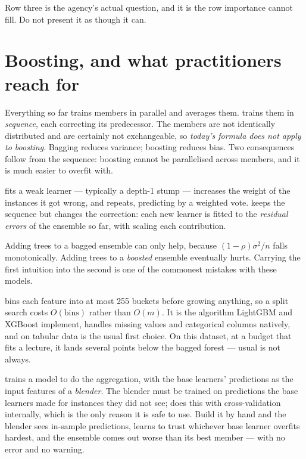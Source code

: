 \documentclass[11pt,a4paper]{article}
\begin{document}
Row three is the agency's actual question, and it is the row importance cannot
fill. Do not present it as though it can.

\section{Boosting, and what practitioners reach for}

Everything so far trains members in parallel and averages them. 
trains them in \emph{sequence}, each correcting its predecessor. The members
are not identically distributed and are certainly not exchangeable, so
\emph{today's formula does not apply to boosting}. Bagging reduces variance;
boosting reduces bias. Two consequences follow from the sequence: boosting
cannot be parallelised across members, and it is much easier to overfit with.

 fits a weak learner --- typically a depth-1 stump ---
increases the weight of the instances it got wrong, and repeats, predicting by
a weighted vote.  keeps the sequence but changes the
correction: each new learner is fitted to the \emph{residual errors} of the
ensemble so far, with  scaling each contribution.

\begin{failbox}[title={Failure condition --- the intuition that does not carry across}]
Adding trees to a bagged ensemble can only help, because $(1-\rho)\sigma^2/n$
falls monotonically. Adding trees to a \emph{boosted} ensemble eventually
hurts. Carrying the first intuition into the second is one of the commonest
mistakes with these models.
\end{failbox}

 bins each feature into at most 255
buckets before growing anything, so a split search costs $O(\text{bins})$
rather than $O(m)$. It is the algorithm LightGBM and XGBoost implement, handles
missing values and categorical columns natively, and on tabular data is the
usual first choice. On this dataset, at a budget that fits a lecture, it lands
several points below the bagged forest --- usual is not always.

 trains a model to do the aggregation, with the base learners'
predictions as the input features of a \emph{blender}. The blender must be
trained on predictions the base learners made for instances they did not see;
 does this with cross-validation internally, which is
the only reason it is safe to use. Build it by hand and the blender sees
in-sample predictions, learns to trust whichever base learner overfits
hardest, and the ensemble comes out worse than its best member --- with no
error and no warning.
\end{document}
